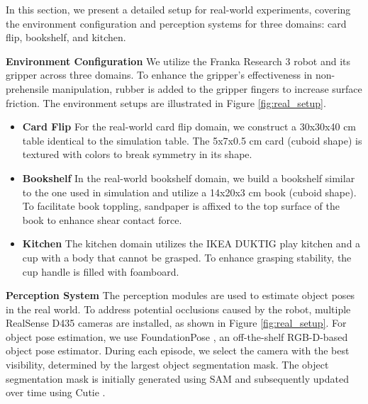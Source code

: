 In this section, we present a detailed setup for real-world experiments, covering the environment configuration and perception systems for three domains: card flip, bookshelf, and kitchen.

\textbf{Environment Configuration} We utilize the Franka Research 3 robot and its gripper across three domains. To enhance the gripper's effectiveness in non-prehensile manipulation, rubber is added to the gripper fingers to increase surface friction. The environment setups are illustrated in Figure \ref{fig:real_setup}.

\begin{itemize}
    \item \textbf{Card Flip} For the real-world card flip domain, we construct a 30x30x40 cm table identical to the simulation table. The 5x7x0.5 cm card (cuboid shape) is textured with colors to break symmetry in its shape.
    
    \item \textbf{Bookshelf} In the real-world bookshelf domain, we build a bookshelf similar to the one used in simulation and utilize a 14x20x3 cm book (cuboid shape). To facilitate book toppling, sandpaper is affixed to the top surface of the book to enhance shear contact force.
    
    \item \textbf{Kitchen} The kitchen domain utilizes the IKEA DUKTIG play kitchen and a cup with a body that cannot be grasped. To enhance grasping stability, the cup handle is filled with foamboard.
\end{itemize}

\textbf{Perception System} The perception modules are used to estimate object poses in the real world. To address potential occlusions caused by the robot, multiple RealSense D435 cameras are installed, as shown in Figure \ref{fig:real_setup}. For object pose estimation, we use FoundationPose \cite{ornek2025foundpose}, an off-the-shelf RGB-D-based object pose estimator. During each episode, we select the camera with the best visibility, determined by the largest object segmentation mask. The object segmentation mask is initially generated using SAM \cite{kirillov2023segment} and subsequently updated over time using Cutie \cite{cheng2024putting}.

\newpage

\begin{figure*}[ht!]
\centering
{}
\caption{The real-world setup for each domain is illustrated, with blue polygons representing the target objects and red circles indicating the camera locations.}\label{fig:real_setup}
\end{figure*}



